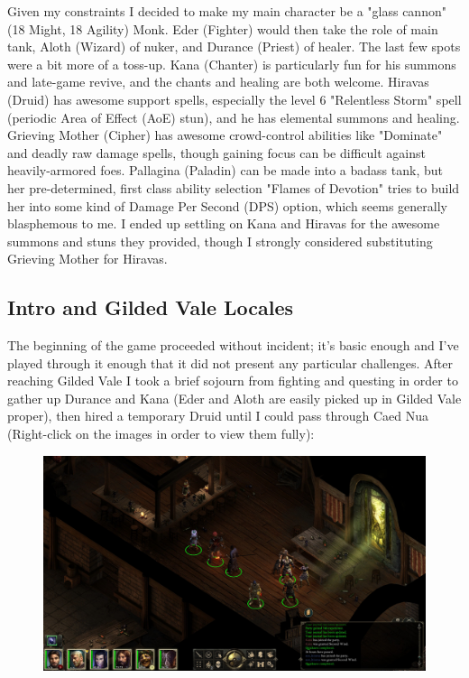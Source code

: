 \documentclass{article}
\begin{document}
Given my constraints I decided to make my main character be a "glass cannon" (18 Might, 18 Agility) Monk.  Eder (Fighter) would then take the role of main tank, Aloth (Wizard) of nuker, and Durance (Priest) of healer.  The last few spots were a bit more of a toss-up.  Kana (Chanter) is particularly fun for his summons and late-game revive, and the chants and healing are both welcome.  Hiravas (Druid) has awesome support spells, especially the level 6 "Relentless Storm" spell (periodic Area of Effect (AoE) stun), and he has elemental summons and healing.  Grieving Mother (Cipher) has awesome crowd-control abilities like "Dominate" and deadly raw damage spells, though gaining focus can be difficult against heavily-armored foes.  Pallagina (Paladin) can be made into a badass tank, but her pre-determined, first class ability selection "Flames of Devotion" tries to build her into some kind of Damage Per Second (DPS) option, which seems generally blasphemous to me.  I ended up settling on Kana and Hiravas for the awesome summons and stuns they provided, though I strongly considered substituting Grieving Mother for Hiravas.

\subsection{Intro and Gilded Vale Locales}
The beginning of the game proceeded without incident; it's basic enough and I've played through it enough that it did not present any particular challenges.  After reaching Gilded Vale I took a brief sojourn from fighting and questing in order to gather up Durance and Kana (Eder and Aloth are easily picked up in Gilded Vale proper), then hired a temporary Druid until I could pass through Caed Nua (Right-click on the images in order to view them fully):

\begin{figure}
\includegraphics[scale=0.33]{files/blog/2018_06_16_pillars_of_eternity_path_of_the_damned_act_i/2018_06_16_full_party.jpg}
\end{figure}
\end{document}
